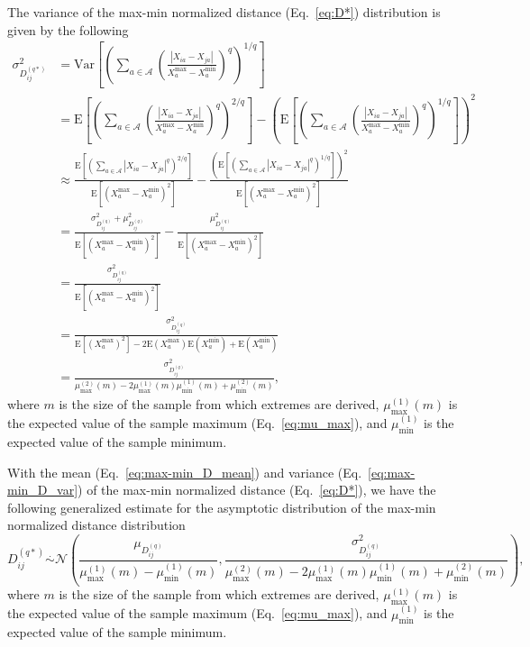 \documentclass[10pt,letterpaper]{article}
\begin{document}
The variance of the max-min normalized distance (Eq.~\ref{eq:D*}) distribution is given by the following
%
\begin{equation}\label{eq:max-min_D_var}
\begin{aligned}
\sigma^2_{D^{(q*)}_{ij}} &= \text{Var}\left[\left(\sum_{a \in \mathcal{A}}\left(\frac{|X_{ia} - X_{ja}|}{X^\text{max}_a - X^\text{min}_a}\right)^q\right)^{1/q}\right] \\
&= \text{E}\left[\left(\sum_{a \in \mathcal{A}}\left(\frac{|X_{ia} - X_{ja}|}{X^\text{max}_a - X^\text{min}_a}\right)^q\right)^{2/q}\right] - \left(\text{E}\left[\left(\sum_{a \in \mathcal{A}}\left(\frac{|X_{ia} - X_{ja}|}{X^\text{max}_a - X^\text{min}_a}\right)^q\right)^{1/q}\right]\right)^2 \\
&\approx \frac{\text{E}\left[\left(\displaystyle \sum_{a \in \mathcal{A}}|X_{ia} - X_{ja}|^q\right)^{2/q}\right]}{\text{E}[(X^\text{max}_a - X^\text{min}_a)^2]} - \frac{\left(\text{E}\left[\left(\displaystyle \sum_{a \in \mathcal{A}}|X_{ia} - X_{ja}|^q\right)^{1/q}\right]\right)^2}{\text{E}[(X^\text{max}_a - X^\text{min}_a)^2]} \\
&= \frac{\sigma^2_{D^{(q)}_{ij}} + \mu^2_{D^{(q)}_{ij}}}{\text{E}[(X^\text{max}_a - X^\text{min}_a)^2]} - \frac{\mu^2_{D^{(q)}_{ij}}}{\text{E}[(X^\text{max}_a - X^\text{min}_a)^2]} \\
&= \frac{\sigma^2_{D^{(q)}_{ij}}}{\text{E}[(X^\text{max}_a - X^\text{min}_a)^2]} \\
&= \frac{\sigma^2_{D^{(q)}_{ij}}}{\text{E}[(X^\text{max}_a)^2] - 2\text{E}(X^\text{max}_a)\text{E}(X^\text{min}_a) + \text{E}(X^\text{min}_a)} \\
&= \frac{\sigma^2_{D^{(q)}_{ij}}}{\mu^{(2)}_\text{max}(m) - 2\mu^{(1)}_\text{max}(m)\mu^{(1)}_\text{min}(m) + \mu^{(2)}_\text{min}(m)},
\end{aligned}
\end{equation}
%
where $m$ is the size of the sample from which extremes are derived, $\mu^{(1)}_\text{max}(m)$ is the expected value of the sample maximum (Eq.~\ref{eq:mu_max}), and $\mu^{(1)}_\text{min}$ is the expected value of the sample minimum.  

With the mean (Eq.~\ref{eq:max-min_D_mean}) and variance (Eq.~\ref{eq:max-min_D_var}) of the max-min normalized distance (Eq.~\ref{eq:D*}), we have the following generalized estimate for the asymptotic distribution of the max-min normalized distance distribution
%
\begin{equation}\label{eq:max-min-DDistr-general}
D^{(q*)}_{ij} \overset{.}{\sim} \mathcal{N}\left(\frac{\mu_{D^{(q)}_{ij}}}{\mu^{(1)}_\text{max}(m) - \mu^{(1)}_\text{min}(m)}, \frac{\sigma^2_{D^{(q)}_{ij}}}{\mu^{(2)}_\text{max}(m) - 2 \mu^{(1)}_\text{max}(m) \mu^{(1)}_\text{min}(m) + \mu^{(2)}_\text{min}(m)}\right),
\end{equation}
%
where $m$ is the size of the sample from which extremes are derived, $\mu^{(1)}_\text{max}(m)$ is the expected value of the sample maximum (Eq.~\ref{eq:mu_max}), and $\mu^{(1)}_\text{min}$ is the expected value of the sample minimum.
\end{document}
